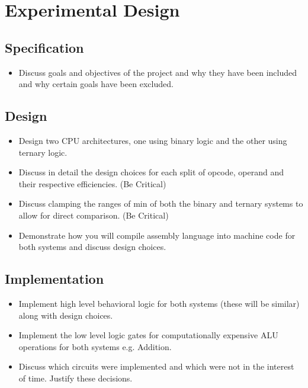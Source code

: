 \documentclass[12pt]{article}
\begin{document}
\section{Experimental Design}

\subsection{Specification}

\begin{itemize}
    \item Discuss goals and objectives of the project and why they have been included and why certain goals have been excluded.
\end{itemize}

\subsection{Design}

\begin{itemize}
    \item Design two CPU architectures, one using binary logic and the other using ternary logic.
    \item Discuss in detail the design choices for each split of opcode, operand and their respective efficiencies. (Be Critical)
    \item Discuss clamping the ranges of min of both the binary and ternary systems to allow for direct comparison. (Be Critical)
    \item Demonstrate how you will compile assembly language into machine code for both systems and discuss design choices.
\end{itemize}

\subsection{Implementation}

\begin{itemize}
    \item Implement high level behavioral logic for both systems (these will be similar) along with design choices.
    \item Implement the low level logic gates for computationally expensive ALU operations for both systems e.g. Addition.
    \item Discuss which circuits were implemented and which were not in the interest of time. Justify these decisions.
\end{itemize}
\end{document}
